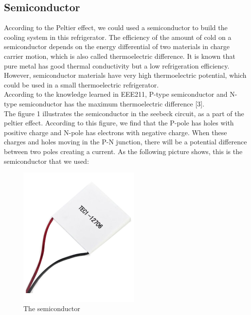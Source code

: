 \documentclass[12pt,onecolumn]{article}
\begin{document}
\subsection{Semiconductor}
According to the Peltier effect, we could used a semiconductor to build the cooling system in this refrigerator. The efficiency of the amount of cold on a semiconductor depends on the energy differential of two materials in charge carrier motion, which is also called thermoelectric difference. It is known that pure metal has good thermal conductivity but a low refrigeration efficiency. However, semiconductor materials have very high thermoelectric potential, which could be used in a small thermoelectric refrigerator.\\
According to the knowledge learned in EEE211, P-type semiconductor and N-type semiconductor has the maximum thermoelectric difference [3].\\
The figure 1 illustrates the semiconductor in the seebeck circuit, as a part of the peltier effect. According to this figure, we find that the P-pole has holes with positive charge and N-pole has electrons with negative charge. When these charges and holes moving in the P-N junction, there will be a potential difference between two poles creating a current. 
As the following picture shows, this is the semiconductor that we used:
\begin{figure}[H]
\centering
\includegraphics[width=6cm]{semiconductor}
\caption{The semiconductor}
\end{figure}
\end{document}
